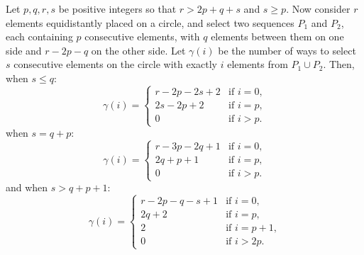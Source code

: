 \documentclass[11pt,a4paper]{article}
\begin{document}
\begin{lemma}
\label{lem:gamma}
Let $p,q,r,s$ be positive integers so that $r > 2p+q+s$ and $s \geq p$. Now consider $r$ elements equidistantly placed on a circle, and select two sequences $P_1$ and $P_2$, each containing $p$ consecutive elements, with $q$ elements between them on one side and $r-2p-q$ on the other side. Let $\gamma(i)$ be the number of ways to select $s$ consecutive elements on the circle with exactly $i$ elements from $P_1 \cup P_2$. Then,
when $s \leq q$:
\[
\gamma(i) = \begin{cases}
  r-2p-2s+2 & \text{if $i = 0$,} \\
  2s-2p+2 & \text{if $i = p$,} \\
  0 & \text{if $i > p$.}
\end{cases}
\]
when $s = q+p$:
\[
\gamma(i) = \begin{cases}
  r-3p-2q+1 & \text{if $i = 0$,} \\
  2q+p+1 & \text{if $i = p$,} \\
  0 & \text{if $i > p$.}
\end{cases}
\]
and when $s > q+p+1$:
\[
\gamma(i) = \begin{cases}
  r-2p-q-s+1 & \text{if $i = 0$,} \\
  2q+2 & \text{if $i = p$,} \\
  2 & \text{if $i = p+1$,} \\
  0 & \text{if $i > 2p$.}
\end{cases}
\]
\end{lemma}
\end{document}
